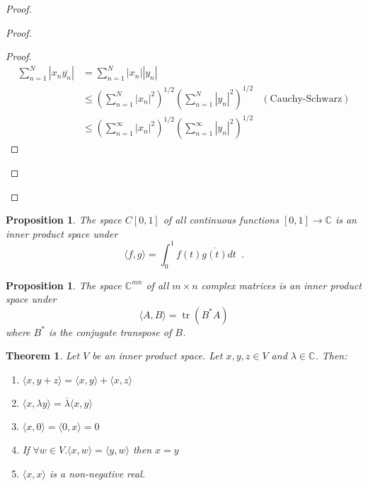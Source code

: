 \documentclass{book}
\let\qed\relax
\newtheorem{prop}[ax]{Proposition}
\newtheorem{thm}[ax]{Theorem}
\theoremstyle{definition}
\newcommand{\tr}{\ensuremath{\operatorname{tr}}}
\begin{document}
\begin{proof}
\pf
{}
\begin{proof}
	\begin{proof}
		\pf
		\begin{align*}
			\sum_{n=1}^N |x_n \overline{y_n}|
			& = \sum_{n=1}^N |x_n| |y_n| \\
			& \leq \left( \sum_{n=1}^N |x_n|^2 \right)^{1/2} \left( \sum_{n=1}^N |y_n|^2 \right)^{1/2} & (\text{Cauchy-Schwarz}) \\
			&\leq \left( \sum_{n=1}^\infty |x_n|^2 \right)^{1/2} \left( \sum_{n=1}^\infty |y_n|^2 \right)^{1/2}
		\end{align*}
	\end{proof}
\end{proof}
\qed
\end{proof}

\begin{prop}
The space $C[0,1]$ of all continuous functions $[0,1] \rightarrow \mathbb{C}$ is an inner product space under
\[ \langle f,g \rangle = \int_0^1 f(t) \overline{g(t)} dt \enspace . \]
\end{prop}

\begin{prop}
The space $\mathbb{C}^{mn}$ of all $m \times n$ complex matrices is an inner product space under
\[ \langle A,B \rangle = \tr (B^* A) \]
where $B^*$ is the conjugate transpose of $B$.
\end{prop}

\begin{thm}
Let $V$ be an inner product space. Let $x,y,z \in V$ and $\lambda \in \mathbb{C}$. Then:
\begin{enumerate}
\item $\langle x, y + z \rangle = \langle x,y \rangle + \langle x,z \rangle$
\item $\langle x, \lambda y \rangle = \overline{\lambda} \langle x,y \rangle$
\item $\langle x,0 \rangle = \langle 0,x \rangle = 0$
\item If $\forall w \in V. \langle x,w \rangle = \langle y,w \rangle$ then $x = y$
\item $\langle x,x \rangle$ is a non-negative real.
\end{enumerate}
\end{thm}
\end{document}
